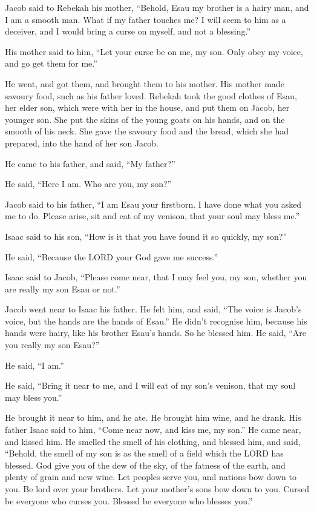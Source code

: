  Jacob said to Rebekah his mother, ``Behold, Esau my
brother is a hairy man, and I am a smooth man.  What if my
father touches me? I will seem to him as a deceiver, and I would bring a
curse on myself, and not a blessing.''

 His mother said to him, ``Let your curse be on me, my son.
Only obey my voice, and go get them for me.''

 He went, and got them, and brought them to his mother. His
mother made savoury food, such as his father loved. 
Rebekah took the good clothes of Esau, her elder son, which were with
her in the house, and put them on Jacob, her younger son. 
She put the skins of the young goats on his hands, and on the smooth of
his neck.  She gave the savoury food and the bread, which
she had prepared, into the hand of her son Jacob.

 He came to his father, and said, ``My father?''

He said, ``Here I am. Who are you, my son?''

 Jacob said to his father, ``I am Esau your firstborn. I
have done what you asked me to do. Please arise, sit and eat of my
venison, that your soul may bless me.''

 Isaac said to his son, ``How is it that you have found it
so quickly, my son?''

He said, ``Because the LORD your God gave me success.''

 Isaac said to Jacob, ``Please come near, that I may feel
you, my son, whether you are really my son Esau or not.''

 Jacob went near to Isaac his father. He felt him, and
said, ``The voice is Jacob's voice, but the hands are the hands of
Esau.''  He didn't recognise him, because his hands were
hairy, like his brother Esau's hands. So he blessed him. 
He said, ``Are you really my son Esau?''

He said, ``I am.''

 He said, ``Bring it near to me, and I will eat of my son's
venison, that my soul may bless you.''

He brought it near to him, and he ate. He brought him wine, and he
drank.  His father Isaac said to him, ``Come near now, and
kiss me, my son.''  He came near, and kissed him. He
smelled the smell of his clothing, and blessed him, and said, ``Behold,
the smell of my son is as the smell of a field which the LORD has
blessed.  God give you of the dew of the sky, of the
fatness of the earth, and plenty of grain and new wine. 
Let peoples serve you, and nations bow down to you. Be lord over your
brothers. Let your mother's sons bow down to you. Cursed be everyone who
curses you. Blessed be everyone who blesses you.''

